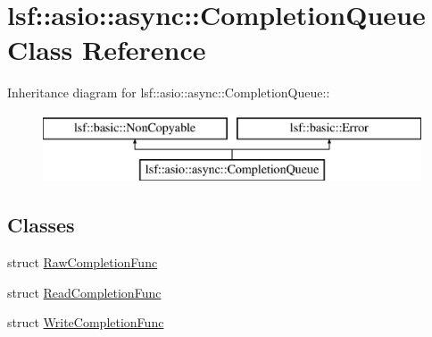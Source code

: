 \hypertarget{classlsf_1_1asio_1_1async_1_1CompletionQueue}{
\section{lsf::asio::async::CompletionQueue Class Reference}
\label{classlsf_1_1asio_1_1async_1_1CompletionQueue}
}
Inheritance diagram for lsf::asio::async::CompletionQueue::\begin{figure}[H]
\begin{center}
\leavevmode
\includegraphics[height=2cm]{classlsf_1_1asio_1_1async_1_1CompletionQueue}
\end{center}
\end{figure}
\subsection*{Classes}
\begin{DoxyCompactItemize}
\item 
struct \hyperlink{structlsf_1_1asio_1_1async_1_1CompletionQueue_1_1RawCompletionFunc}{RawCompletionFunc}
\item 
struct \hyperlink{structlsf_1_1asio_1_1async_1_1CompletionQueue_1_1ReadCompletionFunc}{ReadCompletionFunc}
\item 
struct \hyperlink{structlsf_1_1asio_1_1async_1_1CompletionQueue_1_1WriteCompletionFunc}{WriteCompletionFunc}
\end{DoxyCompactItemize}
